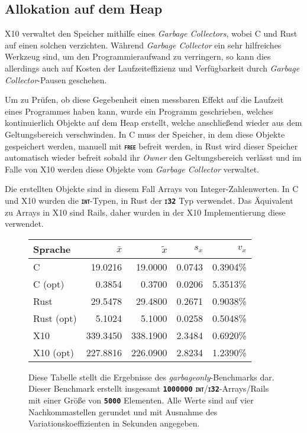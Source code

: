 \FloatBarrier

\subsection{Allokation auf dem Heap}

X10 verwaltet den Speicher mithilfe eines \textit{Garbage Collectors}, wobei C und Rust auf einen solchen verzichten.
Während \textit{Garbage Collector} ein sehr hilfreiches Werkzeug sind,
um den Programmieraufwand zu verringern, so kann dies
allerdings auch auf Kosten der Laufzeiteffizienz und Verfügbarkeit durch \textit{Garbage Collector}-Pausen geschehen.

Um zu Prüfen, ob diese Gegebenheit einen messbaren Effekt auf die Laufzeit eines Programmes haben kann,
wurde ein Programm geschrieben, welches kontinuierlich Objekte auf dem Heap erstellt,
welche anschließend wieder aus dem Geltungsbereich verschwinden.
In C muss der Speicher, in dem diese Objekte gespeichert werden, manuell mit \texttt{\textsc{\textbf{free}}}
befreit werden, in Rust wird dieser Speicher automatisch wieder befreit sobald ihr \textit{Owner} den
Geltungsbereich verlässt und im Falle von X10 werden diese Objekte vom \textit{Garbage Collector} verwaltet.

Die erstellten Objekte sind in diesem Fall Arrays von Integer-Zahlenwerten. In C und X10 wurden die
\texttt{\textsc{\textbf{int}}}-Typen, in Rust der \texttt{\textsc{\textbf{i32}}} Typ verwendet. 
Das Äquivalent zu Arrays in X10 sind Rails, daher wurden in der X10 Implementierung diese verwendet.

\begin{figure}[hb]
	\begin{center}
		\begin{tabular}{lrrrr}
			\toprule
			Sprache    & $\bar{x}$ & $\tilde{x}$ & $s_x$ & $v_x$ \\
			\midrule
			C          &  19.0216 &  19.0000 & 0.0743 & 0.3904\%  \\
			C (opt)    &   0.3854 &   0.3700 & 0.0206 & 5.3513\%  \\
			Rust       &  29.5478 &  29.4800 & 0.2671 & 0.9038\%  \\
			Rust (opt) &   5.1024 &   5.1000 & 0.0258 & 0.5048\%  \\
			X10        & 339.3450 & 338.1900 & 2.3484 & 0.6920\%  \\
			X10 (opt)  & 227.8816 & 226.0900 & 2.8234 & 1.2390\%  \\
			\bottomrule
		\end{tabular}
	\end{center}
	\caption{
		Diese Tabelle stellt die Ergebnisse des \textit{garbageonly}-Benchmarks dar. Dieser Benchmark erstellt insgesamt
		\texttt{\textsc{\textbf{1000000}}} \texttt{\textsc{\textbf{int}}}/\texttt{\textsc{\textbf{i32}}}-Arrays/Rails
		mit einer Größe von \texttt{\textsc{\textbf{5000}}} Elementen.
		Alle Werte sind auf vier Nachkommastellen gerundet und mit Ausnahme des Variationskoeffizienten
		in Sekunden angegeben.
	}
	\label{fig:garbageonly_table}
\end{figure}

